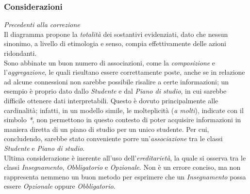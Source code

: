 \documentclass{article}
\begin{document}
\subsubsection*{Considerazioni}
\textit{Precedenti alla correzione}\\
Il diagramma propone la \textit{totalità} dei sostantivi evidenziati, dato che nessun sinonimo, a livello di etimologia e senso, compia effettivamente delle azioni ridondanti.\\
Sono abbinate un buon numero di associazioni, come la \textit{composizione} e l'\textit{aggregazione}, le quali risultano essere correttamente poste, anche se in relazione ad alcune connessioni non sarebbe possibile risalire a certe informazioni; un esempio è proprio dato dallo \textit{Studente} e dal \textit{Piano di studio}, in cui sarebbe difficile ottenere dati interpretabili. Questo è dovuto principalmente alle cardinalità; infatti, in un modello simile, le molteplicità (\textit{a molti}), indicate con il simbolo \textit{*}, non permettono in questo contesto di poter acquisire informazioni in maniera diretta di un piano di studio per un unico studente. Per cui, concludendo, sarebbe stato conveniente porre un'\textit{associazione} tra le classi \textit{Studente} e \textit{Piano di studio}.\\
Ultima considerazione è inerente all'uso dell'\textit{ereditarietà}, la quale si osserva tra le classi \textit{Insegnamento}, \textit{Obbligatorio} e \textit{Opzionale}. Non è un errore conciso, ma non rappresenta nemmeno un buon metodo per esprimere che un \textit{Insegnamento} possa essere \textit{Opzionale} oppure \textit{Obbligatorio}.
\pagebreak
\end{document}
